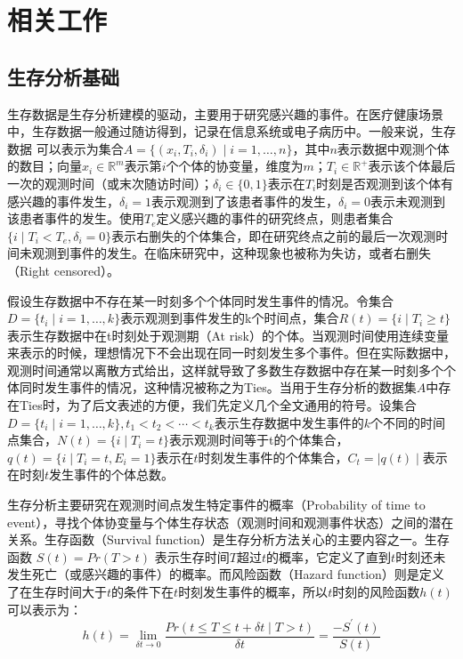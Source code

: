 \chapter{相关工作}

\section{生存分析基础}
生存数据是生存分析建模的驱动，主要用于研究感兴趣的事件。在医疗健康场景中，生存数据一般通过随访得到，记录在信息系统或电子病历中。一般来说，生存数据 可以表示为集合$A=\{(x_i,T_i,\delta_i ) \mid i=1,\dots,n\}$，其中$n$表示数据中观测个体的数目；向量$x_i\in \mathbb{R}^m$表示第$i$个个体的协变量，维度为$m$；$T_i\in \mathbb{R}^+$表示该个体最后一次的观测时间（或末次随访时间）；$\delta_i\in \{0,1\}$表示在$T_i$时刻是否观测到该个体有感兴趣的事件发生，$\delta_i=1$表示观测到了该患者事件的发生，$\delta_i=0$表示未观测到该患者事件的发生。使用$T_e$定义感兴趣的事件的研究终点，则患者集合$\{i \mid T_i<T_e,\delta_i=0\}$表示右删失的个体集合，即在研究终点之前的最后一次观测时间未观测到事件的发生。在临床研究中，这种现象也被称为失访，或者右删失（Right censored）。

假设生存数据中不存在某一时刻多个个体同时发生事件的情况。令集合$D=\{t_i \mid i=1,\dots,k\}$表示观测到事件发生的k个时间点，集合$R(t)=\{i \mid T_i\ge t\}$表示生存数据中在t时刻处于观测期（At risk）的个体。当观测时间使用连续变量来表示的时候，理想情况下不会出现在同一时刻发生多个事件。但在实际数据中，观测时间通常以离散方式给出，这样就导致了多数生存数据中存在某一时刻多个个体同时发生事件的情况，这种情况被称之为Ties。当用于生存分析的数据集$A$中存在Ties时，为了后文表述的方便，我们先定义几个全文通用的符号。设集合$D=\{t_i \mid i=1,\dots,k\},t_1<t_2<\cdots<t_k$表示生存数据中发生事件的$k$个不同的时间点集合，$N(t)=\{i \mid T_i=t\}$表示观测时间等于t的个体集合，$q(t)=\{i \mid T_i=t,E_i=1\}$表示在$t$时刻发生事件的个体集合，$C_t=\mid q(t) \mid$表示在时刻$t$发生事件的个体总数。

生存分析主要研究在观测时间点发生特定事件的概率（Probability of time to event），寻找个体协变量与个体生存状态（观测时间和观测事件状态）之间的潜在关系。生存函数（Survival function）是生存分析方法关心的主要内容之一。生存函数 $S(t)=Pr(T>t)$ 表示生存时间$T$超过$t$的概率，它定义了直到$t$时刻还未发生死亡（或感兴趣的事件）的概率。而风险函数（Hazard function）则是定义了在生存时间大于$t$的条件下在$t$时刻发生事件的概率，所以$t$时刻的风险函数$h(t)$可以表示为：
\begin{equation}
h(t)=\lim_{\delta t \rightarrow 0} \frac{Pr(t \le T\le t + \delta t \mid T>t)}{\delta t}
    =\frac{-S^{'}(t)}{S(t)} \label{F1}
\end{equation}

